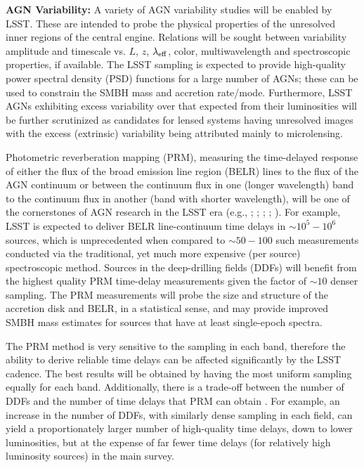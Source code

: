 {\bf AGN Variability:} A variety of AGN variability studies will be
enabled by LSST. These are intended to probe the physical properties
of the unresolved inner regions of the central engine. Relations will
be sought between variability amplitude and timescale vs. $L$, $z$,
$\lambda_{\rm eff}$, color, multiwavelength and spectroscopic
properties, if available. The LSST sampling is expected to provide
high-quality power spectral density (PSD) functions for a large number
of AGNs; these can be used to constrain the SMBH mass and accretion
rate/mode. Furthermore, LSST AGNs exhibiting excess variability over
that expected from their luminosities will be further scrutinized as
candidates for lensed systems having unresolved images with the excess
(extrinsic) variability being attributed mainly to microlensing.

Photometric reverberation mapping (PRM), measuring the time-delayed
response of either the flux of the broad emission line region (BELR)
lines to the flux of the AGN continuum or between the continuum flux
in one (longer wavelength) band to the continuum flux in another
(band with shorter wavelength), will be one of the cornerstones of
AGN research in the LSST era (e.g., \citet{Chelouche2013};
\citet{CheloucheandZucker2013}; \citet{CheloucheEtal2014};
\citet{EdelsonEtal2015}; \citet{FausnaughEtal2015}). For example,
LSST is expected to deliver BELR line-continuum time delays in
$\sim10^5-10^6$ sources, which is unprecedented when compared to
$\sim50-100$ such measurements conducted via the traditional, yet
much more expensive (per source) spectroscopic method. Sources in
the deep-drilling fields (DDFs) will benefit from the highest quality
PRM time-delay measurements given the factor of $\sim10$ denser
sampling. The PRM measurements will probe the size and structure of
the accretion disk and BELR, in a statistical sense, and may provide
improved SMBH mass estimates for sources that have at least
single-epoch spectra.

The PRM method is very sensitive to the sampling in each band,
therefore the ability to derive reliable time delays can be affected
significantly by the LSST cadence. The best results will be obtained
by having the most uniform sampling equally for each band.
Additionally, there is a trade-off between the number of DDFs and
the number of time delays that PRM can obtain \citep{CheloucheEtal2014}.
For example, an increase in the number of DDFs, with similarly dense
sampling in each field, can yield a proportionately larger number of
high-quality time delays, down to lower luminosities, but at the
expense of far fewer time delays (for relatively high luminosity
sources) in the main survey.


